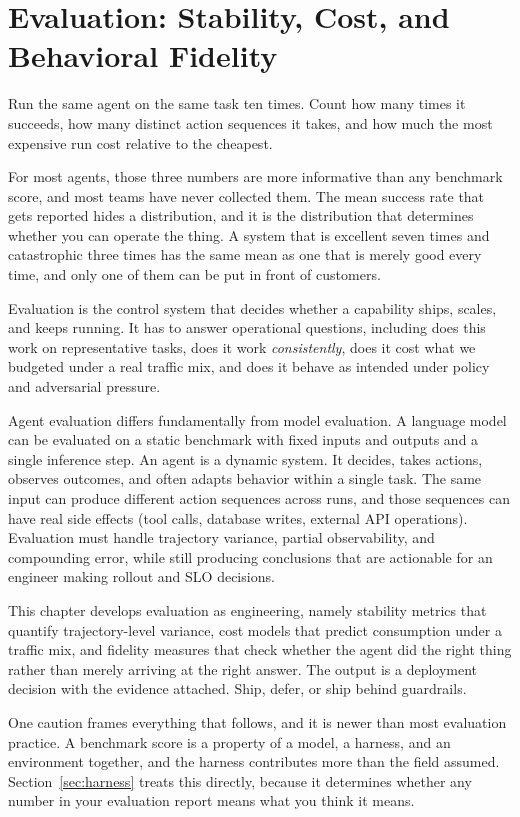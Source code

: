 \chapter{Evaluation: Stability, Cost, and Behavioral Fidelity}
\label{ch:evaluation}

Run the same agent on the same task ten times. Count how many times it succeeds,
how many distinct action sequences it takes, and how much the most expensive run
cost relative to the cheapest.

For most agents, those three numbers are more informative than any benchmark
score, and most teams have never collected them. The mean success rate that gets
reported hides a distribution, and it is the distribution that determines whether
you can operate the thing. A system that is excellent seven times and
catastrophic three times has the same mean as one that is merely good every time,
and only one of them can be put in front of customers.

Evaluation is the control system that decides whether a capability ships, scales,
and keeps running. It has to answer operational questions, including does this work on
representative tasks, does it work \emph{consistently}, does it cost what we
budgeted under a real traffic mix, and does it behave as intended under policy and
adversarial pressure.

Agent evaluation differs fundamentally from model evaluation. A language model can be evaluated on a static benchmark with fixed inputs and outputs and a single inference step. An agent is a dynamic system. It decides, takes actions, observes outcomes, and often adapts behavior within a single task. The same input can produce different action sequences across runs, and those sequences can have real side effects (tool calls, database writes, external API operations). Evaluation must handle trajectory variance, partial observability, and compounding error, while still producing conclusions that are actionable for an engineer making rollout and SLO decisions.

This chapter develops evaluation as engineering, namely stability metrics that quantify
trajectory-level variance, cost models that predict consumption under a traffic
mix, and fidelity measures that check whether the agent did the right thing rather
than merely arriving at the right answer. The output is a deployment decision with the evidence attached. Ship, defer, or ship behind guardrails.

One caution frames everything that follows, and it is newer than most evaluation
practice. A benchmark score is a property of a model, a harness, and an environment
together, and the harness contributes more
than the field assumed. Section~\ref{sec:harness} treats this directly, because
it determines whether any number in your evaluation report means what you think it
means.

